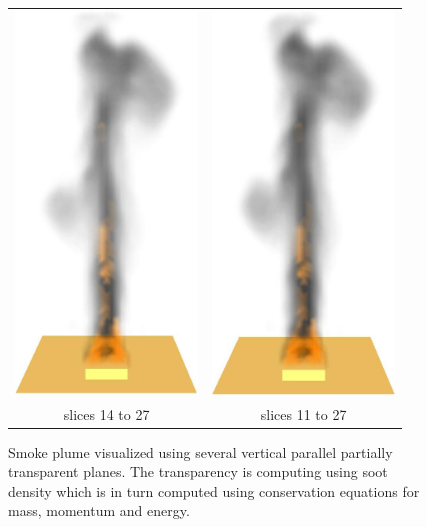 \begin{figure}[\figoptions]
\begin{center}
\begin{tabular}{cc}
\includegraphics[height=4.0in]{figures/splume_14_27}&
\includegraphics[height=4.0in]{figures/splume_11_27}\\
slices 14 to 27&slices 11 to 27
\end{tabular}
\end{center}
\caption [Smoke plume visualized using several vertical parallel
partially transparent planes.] {Smoke plume visualized using
several vertical parallel partially transparent planes. The
transparency is computing using soot density which is in turn
computed using conservation equations for mass, momentum and
energy. } \label{figplume}
\end{figure}

